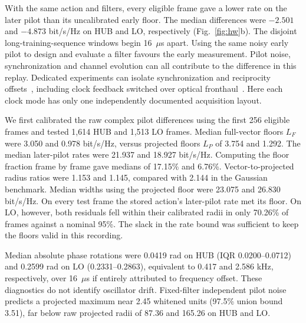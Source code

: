 With the same action and filters, every eligible frame gave a lower rate on the later pilot than its uncalibrated early floor. The median differences were \(-2.501\) and \(-4.873\) bit/s/Hz on HUB and LO, respectively (Fig.~\ref{fig:hw}b). The disjoint long-training-sequence windows begin 16~\(\mu\)s apart. Using the same noisy early pilot to design and evaluate a filter favours the early measurement. Pilot noise, synchronization and channel evolution can all contribute to the difference in this replay. Dedicated experiments can isolate synchronization and reciprocity offsets~\cite{rogalin,vieira,ganesan}, including clock feedback switched over optical fronthaul~\cite{zhangsync2026}. Here each clock mode has only one independently documented acquisition layout.

We first calibrated the raw complex pilot differences using the first 256 eligible frames and tested 1,614 HUB and 1,513 LO frames. Median full-vector floors \(L_F\) were 3.050 and 0.978 bit/s/Hz, versus projected floors \(L_P\) of 3.754 and 1.292. The median later-pilot rates were 21.937 and 18.927 bit/s/Hz. Computing the floor fraction frame by frame gave medians of 17.15\% and 6.76\%. Vector-to-projected radius ratios were 1.153 and 1.145, compared with 2.144 in the Gaussian benchmark. Median widths using the projected floor were 23.075 and 26.830 bit/s/Hz. On every test frame the stored action's later-pilot rate met its floor. On LO, however, both residuals fell within their calibrated radii in only 70.26\% of frames against a nominal 95\%. The slack in the rate bound was sufficient to keep the floors valid in this recording.


Median absolute phase rotations were 0.0419 rad on HUB (IQR 0.0200--0.0712) and 0.2599 rad on LO (0.2331--0.2863), equivalent to 0.417 and 2.586 kHz, respectively, over 16~\(\mu\)s if entirely attributed to frequency offset. These diagnostics do not identify oscillator drift. Fixed-filter independent pilot noise predicts a projected maximum near 2.45 whitened units (97.5\% union bound 3.51), far below raw projected radii of 87.36 and 165.26 on HUB and LO.


